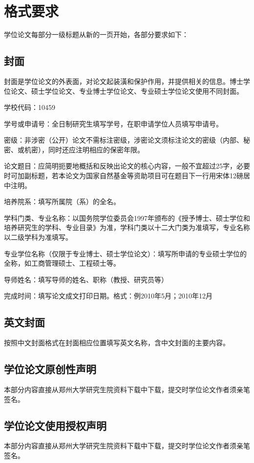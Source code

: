 \chapter{格式要求}
\label{geshiyaoqiu}
学位论文每部分一级标题从新的一页开始，各部分要求如下：

\section{封面}
封面是学位论文的外表面，对论文起装潢和保护作用，并提供相关的信息。博士学位论文、硕士学位论文、专业博士学位论文、专业硕士学位论文使用不同封面。

学校代码：10459

学号或申请号：全日制研究生填写学号，在职申请学位人员填写申请号。

密级：非涉密（公开）论文不需标注密级，涉密论文须标注论文的密级（内部、秘密、或机密），同时还应注明相应的保密年限。

论文题目：应简明扼要地概括和反映出论文的核心内容，一般不宜超过25字，必要时可加副标题，若本论文为国家自然基金等资助项目可在题目下一行用宋体12磅居中注明。

培养院系：填写所属院（系）的全名。

学科门类、专业名称：以国务院学位委员会1997年颁布的《授予博士、硕士学位和培养研究生的学科、专业目录》为准，学科门类以十二大门类为准填写，专业名称以二级学科为准填写。

专业学位名称（仅限于专业博士、硕士学位论文）：填写所申请的专业硕士学位的全称，如工商管理硕士、工程硕士等。

导师姓名：填写导师的姓名、职称（教授、研究员等）

完成时间：填写论文成文打印日期。格式：例2010年5月；2010年12月

\section{英文封面}
按照中文封面格式在封面相应位置填写英文名称，含中文封面的主要内容。

\section{学位论文原创性声明}
本部分内容直接从郑州大学研究生院资料下载中下载，提交时学位论文作者须亲笔签名。

\section{学位论文使用授权声明}
本部分内容直接从郑州大学研究生院资料下载中下载，提交时学位论文作者须亲笔签名。

